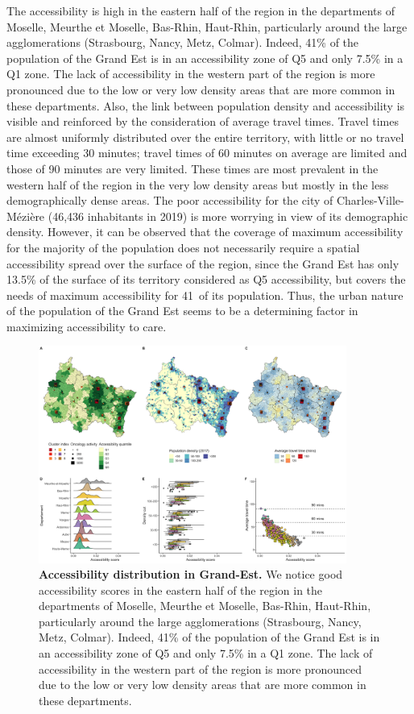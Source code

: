 The accessibility is high in the eastern half of the region in the departments
of Moselle, Meurthe et Moselle, Bas-Rhin, Haut-Rhin, particularly around the
large agglomerations (Strasbourg, Nancy, Metz, Colmar). Indeed, 41\% of the
population of the Grand Est is in an accessibility zone of Q5 and only 7.5\% in
a Q1 zone. The lack of accessibility in the western part of the region is more
pronounced due to the low or very low density areas that are more common in
these departments. Also, the link between population density and accessibility
is visible and reinforced by the consideration of average travel times. Travel
times are almost uniformly distributed over the entire territory, with little or
no travel time exceeding 30 minutes; travel times of 60 minutes on average are
limited and those of 90 minutes are very limited. These times are most prevalent
in the western half of the region in the very low density areas but mostly in
the less demographically dense areas.  The poor accessibility for the city of
Charles-Ville-Mézière (46,436 inhabitants in 2019) is more worrying in view of
its demographic density. However, it can be observed that the coverage of
maximum accessibility for the majority of the population does not necessarily
require a spatial accessibility spread over the surface of the region, since the
Grand Est has only 13.5\% of the surface of its territory considered as Q5
accessibility, but covers the needs of maximum accessibility for 41\ of its
population. Thus, the urban nature of the population of the Grand Est seems to
be a determining factor in maximizing accessibility to care.

\begin{figure}[h!]
    \includegraphics[width=0.9\textwidth]{images/camion/region_accessibility/accessibility_Grand-Est.png}
    \centering
    \caption{ \textbf{Accessibility distribution in Grand-Est.} We notice good
        accessibility scores in the eastern half of the region in the
        departments of Moselle, Meurthe et Moselle, Bas-Rhin, Haut-Rhin,
        particularly around the large agglomerations (Strasbourg, Nancy, Metz,
        Colmar). Indeed, 41\% of the population of the Grand Est is in an
        accessibility zone of Q5 and only 7.5\% in a Q1 zone. The lack of
        accessibility in the western part of the region is more pronounced due
        to the low or very low density areas that are more common in these
        departments. }
\end{figure}

